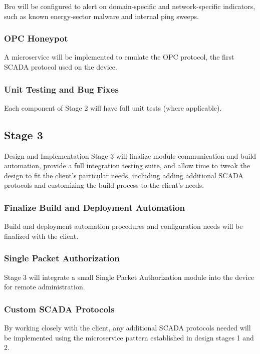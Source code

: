 Bro will be configured to alert on domain-specific and network-specific
indicators, such as known energy-sector malware and internal ping sweeps.

\subsubsection{OPC Honeypot}

A microservice will be implemented to emulate the OPC protocol, the first
SCADA protocol used on the device.

\subsubsection{Unit Testing and Bug Fixes}

Each component of Stage 2 will have full unit tests (where applicable).


\subsection{Stage 3}

Design and Implementation Stage 3 will finalize module communication and
build automation, provide a full integration testing suite, and allow time
to tweak the design to fit the client's particular needs, including adding
additional SCADA protocols and customizing the build process to the client's
needs.

\subsubsection{Finalize Build and Deployment Automation}

Build and deployment automation procedures and configuration needs will be
finalized with the client.

\subsubsection{Single Packet Authorization}

Stage 3 will integrate a small Single Packet Authorization module into the
device for remote administration.

\subsubsection{Custom SCADA Protocols}

By working closely with the client, any additional SCADA protocols needed will
be implemented using the microservice pattern established in design stages 1
and 2.

